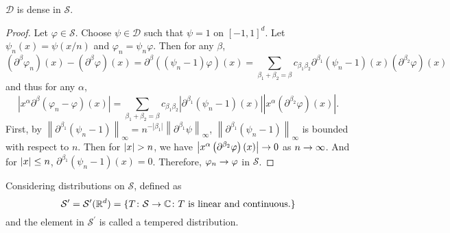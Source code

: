 \begin{enumerate}
	\begin{prop}
		$\mathcal{D}$ is dense in $\mathcal{S}$.
	\end{prop}
	\begin{proof}
		Let $\varphi \in \mathcal{S}$. Choose $\psi \in \mathcal{D}$ such that $\psi = 1$ on $[-1,1]^d$. Let $\psi_n(x)= \psi(x/n)$ and $\varphi_n = \psi_n \varphi$. Then for any $\beta$,
		\begin{equation*}
			\left(\partial^\beta \varphi_n\right)(x)-\left(\partial^\beta \varphi\right)(x)=\partial^\beta\left(\left(\psi_n-1\right) \varphi\right)(x)=\sum_{\beta_1+\beta_2=\beta} c_{\beta_1 \beta_2} \partial^{\beta_1}\left(\psi_n-1\right)(x)\left(\partial^{\beta_2} \varphi\right)(x)
		\end{equation*}
		and thus for any $\alpha$,
		\begin{equation*}
			\left|x^\alpha \partial^\beta\left(\varphi_n-\varphi\right)(x)\right|=\sum_{\beta_1+\beta_2=\beta} c_{\beta_1 \beta_2}\left|\partial^{\beta_1}\left(\psi_n-1\right)(x)\right|\left|x^\alpha\left(\partial^{\beta_2} \varphi\right)(x)\right| .
		\end{equation*}
		First, by $\left\|\partial^{\beta_1}\left(\psi_n-1\right)\right\|_{\infty}=n^{-\left|\beta_1\right|}\left\|\partial^{\beta_1} \psi\right\|_{\infty}$, $\left\|\partial^{\beta_1}\left(\psi_n-1\right)\right\|_{\infty}$ is bounded with respect to $n$. Then for $\left\lvert x\right\lvert > n$, we have $\left|x^\alpha\left(\partial^{\beta_2} \varphi\right)(x)\right| \rightarrow 0$ as $n \rightarrow \infty$. And for $\left\lvert x\right\lvert \leq n$, $\partial^{\beta_1}\left(\psi_n-1\right)(x)=0$. Therefore, $\varphi_n \rightarrow \varphi$ in $\mathcal{S}$.
	\end{proof}

	Considering distributions on $\mathcal{S}$, defined as
	\begin{equation*}
		\mathcal{S}^\prime = \mathcal{S}^\prime(\mathbb{R}^d) = \left\{T \colon \mathcal{S} \rightarrow \mathbb{C} \colon T \text{ is linear and continuous.}\right\}
	\end{equation*}
	and the element in $\mathcal{S}^\prime$ is called a tempered distribution. 


\end{enumerate}
